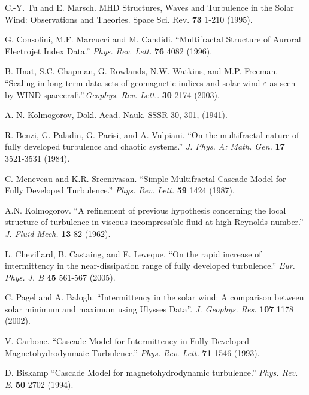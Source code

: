\documentclass[aps,prl,amsmath,amssymb,reprint,superscriptaddress]{revtex4-1} %
\begin{document}
\begin{thebibliography}{99}
 C.-Y. Tu and E. Marsch. MHD Structures, Waves and Turbulence in the Solar Wind: Observations and Theories. Space Sci. Rev. {\bf 73} 1-210 (1995).

 G. Consolini, M.F. Marcucci and M. Candidi. ``Multifractal Structure of Auroral Electrojet Index Data.'' {\it Phys. Rev. Lett.} {\bf 76} 4082 (1996).

 B. Hnat, S.C. Chapman, G. Rowlands, N.W. Watkins, and M.P. Freeman. ``Scaling in long term data sets of geomagnetic indices and solar wind $\varepsilon$ as seen by WIND spacecraft''.{\it Geophys. Rev. Lett.}. {\bf 30} 2174 (2003).

 A. N. Kolmogorov, Dokl. Acad. Nauk. SSSR 30, 301, (1941).


 R. Benzi, G. Paladin, G. Parisi, and A. Vulpiani. ``On the multifractal nature of fully developed turbulence and chaotic systems.'' {\it J. Phys. A: Math. Gen.} {\bf 17} 3521-3531 (1984).

 C. Meneveau and K.R. Sreenivasan. ``Simple Multifractal Cascade Model for Fully Developed Turbulence.'' {\it Phys. Rev. Lett.} {\bf 59} 1424 (1987).

 A.N. Kolmogorov. ``A refinement of previous hypothesis concerning the local structure of turbulence in viscous incompressible fluid at high Reynolds number.'' {\it J. Fluid Mech.} {\bf 13} 82 (1962).

 L. Chevillard, B. Castaing, and E. Leveque. ``On the rapid increase of intermittency in the near-dissipation range of fully developed turbulence.'' {\it Eur. Phys. J. B} {\bf 45} 561-567 (2005).

 C. Pagel and A. Balogh. ``Intermittency in the solar wind: A comparison between solar minimum and maximum using Ulysses Data''. {\it J. Geophys. Res.} {\bf 107} 1178 (2002).

 V. Carbone. ``Cascade Model for Intermittency in Fully Developed Magnetohydrodynmaic Turbulence.'' {\it Phys. Rev. Lett.} {\bf 71} 1546 (1993).

 D. Biskamp ``Cascade Model for magnetohydrodynamic turbulence.'' {\it Phys. Rev. E}. {\bf 50} 2702 (1994).


\end{thebibliography}
\end{document}
